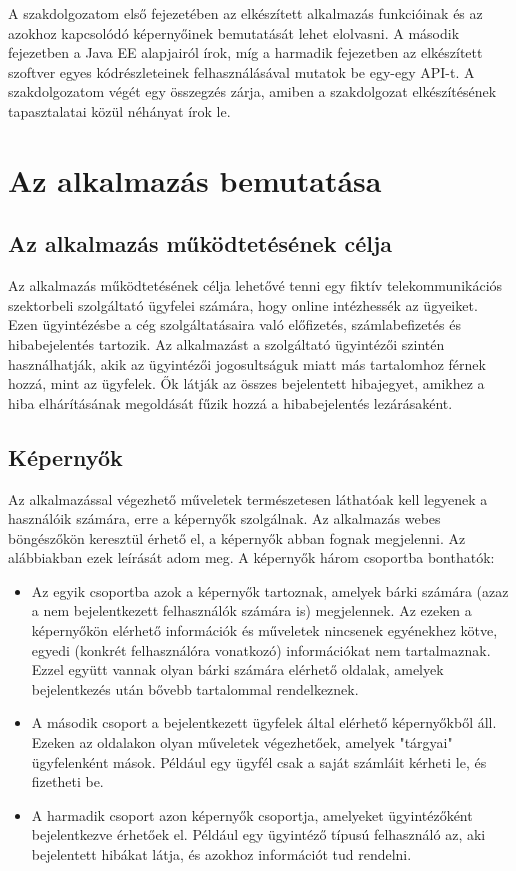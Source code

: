 \documentclass[centeredchapter]{thesis-ekf}
\theoremstyle{definition}
\theoremstyle{remark}
\begin{document}
A szakdolgozatom első fejezetében az elkészített alkalmazás funkcióinak és az azokhoz kapcsolódó képernyőinek bemutatását lehet elolvasni. A második fejezetben a Java EE alapjairól írok, míg a harmadik fejezetben az elkészített szoftver egyes kódrészleteinek felhasználásával mutatok be egy-egy API-t. A szakdolgozatom végét egy összegzés zárja, amiben a szakdolgozat elkészítésének tapasztalatai közül néhányat írok le.

\chapter{Az alkalmazás bemutatása}

\section{Az alkalmazás működtetésének célja}

Az alkalmazás működtetésének célja lehetővé tenni egy fiktív telekommunikációs szektorbeli szolgáltató ügyfelei számára, hogy online intézhessék az ügyeiket. Ezen ügyintézésbe a cég szolgáltatásaira való előfizetés, számlabefizetés és hibabejelentés tartozik. Az alkalmazást a szolgáltató ügyintézői szintén használhatják, akik az ügyintézői jogosultságuk miatt más tartalomhoz férnek hozzá, mint az ügyfelek. Ők látják az összes bejelentett hibajegyet, amikhez a hiba elhárításának megoldását fűzik hozzá a hibabejelentés lezárásaként. 

\section{Képernyők}

Az alkalmazással végezhető műveletek természetesen láthatóak kell legyenek a használóik számára, erre a képernyők szolgálnak. Az alkalmazás webes böngészőkön keresztül érhető el, a képernyők abban fognak megjelenni. Az alábbiakban ezek leírását adom meg.
A képernyők három csoportba bonthatók:
 
 \begin{itemize}
 	\item Az egyik csoportba azok a képernyők tartoznak, amelyek bárki számára (azaz a nem bejelentkezett felhasználók számára is) megjelennek. Az ezeken a képernyőkön elérhető információk és műveletek nincsenek egyénekhez kötve, egyedi (konkrét felhasználóra vonatkozó) információkat nem tartalmaznak. Ezzel együtt vannak olyan bárki számára elérhető oldalak, amelyek bejelentkezés után bővebb tartalommal rendelkeznek.
 	\item A második csoport a bejelentkezett ügyfelek által elérhető képernyőkből áll. Ezeken az oldalakon olyan műveletek végezhetőek, amelyek "tárgyai" ügyfelenként mások. Például egy ügyfél csak a saját számláit kérheti le, és fizetheti be.
 	\item A harmadik csoport azon képernyők csoportja, amelyeket ügyintézőként bejelentkezve érhetőek el. Például egy ügyintéző típusú felhasználó az, aki bejelentett hibákat látja, és azokhoz információt tud rendelni.
 \end{itemize}
  
\end{document}

